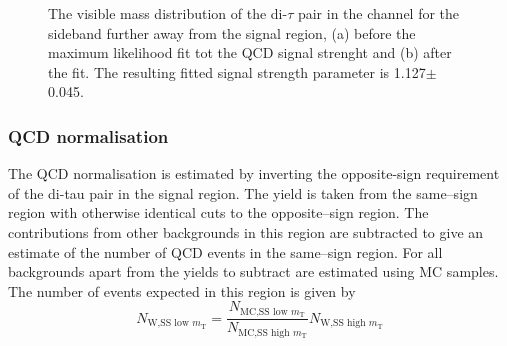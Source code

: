 \begin{figure}[h!]
\begin{center}
\end{center}
\caption{The visible mass distribution of the di-$\tau$ pair in the \etau channel for the sideband further away from the signal region, (a) before
the maximum likelihood fit tot the QCD signal strenght and (b) after the fit. The resulting fitted signal strength parameter
is 1.127$\pm$0.045.}
\label{fig:mssm_qcdosss_etfar}
\end{figure}

\subsubsection{QCD normalisation}
\label{sec:mssm_bkgs_etmt_qcdnorm}
The QCD normalisation is estimated by inverting the opposite-sign requirement
of the di-tau pair in the signal region. The yield is taken from the same--sign
region with otherwise identical cuts to the opposite--sign region. The contributions
from other backgrounds in this region are subtracted to give an estimate of the number
of QCD events in the same--sign region. For all backgrounds apart from \Wjets the
yields to subtract are estimated using \ac{MC} samples. The number of \Wjets events
expected in this region is given by
\begin{equation}\label{eqn:wjets_qcdsub}
N_{\text{W,SS low }m_{\text{T}}} = \frac{N_{\text{MC,SS low }m_{\text{T}}}}{N_{\text{MC,SS high }m_{\text{T}}}}N_{\text{W,SS high }m_{\text{T}}}
\end{equation}

